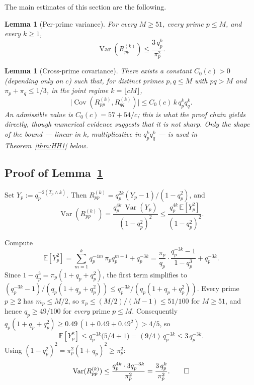 \documentclass[11pt]{article}
\newtheorem{lemma}[theorem]{Lemma}
\theoremstyle{remark}
\newcommand{\EE}{\mathbb{E}}
\DeclareMathOperator{\Var}{Var}
\DeclareMathOperator{\Cov}{Cov}
\begin{document}
The main estimates of this section are the following.

\begin{lemma}[Per-prime variance]\label{lem:bd1}
For every $M \geq 51$, every prime $p \leq M$, and every $k \geq 1$,
\begin{equation}\label{eq:Rppbd}
\Var(R_{pp}^{(k)}) \leq \frac{3\, q_p^k}{\pi_p^2}.
\end{equation}
\end{lemma}

\begin{lemma}[Cross-prime covariance]\label{lem:bd2}
There exists a constant $C_0(c) > 0$ (depending only on $c$) such that, for distinct primes $p, q \leq M$ with $pq > M$ and $\pi_p + \pi_q \leq 1/3$, in the joint regime $k = \lfloor cM \rfloor$,
\begin{equation}\label{eq:Covbd}
\bigl|\Cov(R_{pp}^{(k)}, R_{qq}^{(k)})\bigr| \leq C_0(c)\, k\, q_p^k q_q^k.
\end{equation}
An admissible value is $C_0(c) = 57 + 54/c$; this is what the proof chain yields directly, though numerical evidence suggests that it is not sharp. Only the shape of the bound --- linear in $k$, multiplicative in $q_p^k q_q^k$ --- is used in Theorem~\ref{thm:HH1} below.
\end{lemma}

\subsection{Proof of Lemma~\ref{lem:bd1}}

Set $Y_p := q_p^{-2(T_p \wedge k)}$. Then $R_{pp}^{(k)} = q_p^{2k}(Y_p - 1)/(1 - q_p^2)$, and
\[
\Var(R_{pp}^{(k)}) = \frac{q_p^{4k}\, \Var(Y_p)}{(1 - q_p^2)^2} \leq \frac{q_p^{4k}\, \EE[Y_p^2]}{(1 - q_p^2)^2}.
\]

Compute
\[
\EE[Y_p^2] = \sum_{m=1}^k q_p^{-4m}\, \pi_p q_p^{m-1} + q_p^{-3k} = \frac{\pi_p}{q_p} \cdot \frac{q_p^{-3k} - 1}{1 - q_p^3} + q_p^{-3k}.
\]
Since $1 - q_p^3 = \pi_p (1 + q_p + q_p^2)$, the first term simplifies to $(q_p^{-3k} - 1)/(q_p (1 + q_p + q_p^2)) \leq q_p^{-3k}/(q_p(1 + q_p + q_p^2))$. Every prime $p \geq 2$ has $m_p \leq M/2$, so $\pi_p \leq (M/2)/(M-1) \leq 51/100$ for $M \geq 51$, and hence $q_p \geq 49/100$ for \emph{every} prime $p \leq M$. Consequently $q_p(1 + q_p + q_p^2) \geq 0.49\,(1 + 0.49 + 0.49^2) > 4/5$, so
\[
\EE[Y_p^2] \leq q_p^{-3k}\bigl(5/4 + 1\bigr) = (9/4)\, q_p^{-3k} \leq 3\, q_p^{-3k}.
\]
Using $(1 - q_p^2)^2 = \pi_p^2 (1 + q_p)^2 \geq \pi_p^2$:
\[
\Var(R_{pp}^{(k)}) \leq \frac{q_p^{4k} \cdot 3 q_p^{-3k}}{\pi_p^2} = \frac{3\, q_p^k}{\pi_p^2}. \qedhere
\]
\end{document}
